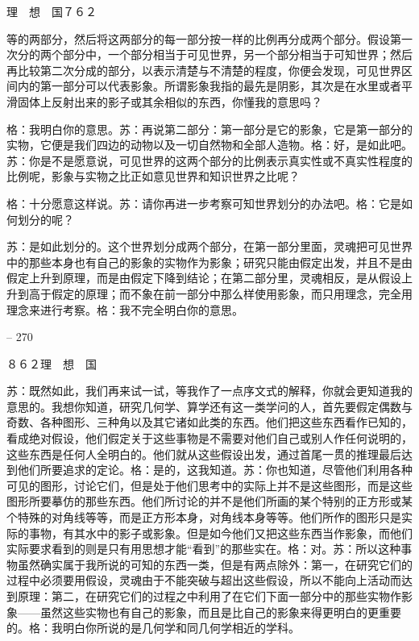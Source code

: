 \documentclass[11pt,oneside]{book}
\begin{document}
\begin{common-format}
    理　想　国７６２

    等的两部分，然后将这两部分的每一部分按一样的比例再分成两个部分。假设第一次分的两个部分中，一个部分相当于可见世界，另一个部分相当于可知世界；然后再比较第二次分成的部分，以表示清楚与不清楚的程度，你便会发现，可见世界区间内的第一部分可以代表影象。所谓影象我指的最先是阴影，其次是在水里或者平滑固体上反射出来的影子或其余相似的东西，你懂我的意思吗？

    格：我明白你的意思。苏：再说第二部分：第一部分是它的影象，它是第一部分的实物，它便是我们四边的动物以及一切自然物和全部人造物。格：好，是如此吧。苏：你是不是愿意说，可见世界的这两个部分的比例表示真实性或不真实性程度的比例呢，影象与实物之比正如意见世界和知识世界之比呢？

    格：十分愿意这样说。苏：请你再进一步考察可知世界划分的办法吧。格：它是如何划分的呢？

    苏：是如此划分的。这个世界划分成两个部分，在第一部分里面，灵魂把可见世界中的那些本身也有自己的影象的实物作为影象；研究只能由假定出发，并且不是由假定上升到原理，而是由假定下降到结论；在第二部分里，灵魂相反，是从假设上升到高于假定的原理；而不象在前一部分中那么样使用影象，而只用理念，完全用理念来进行考察。格：我不完全明白你的意思。

    

-- 270

    ８６２理　想　国

    苏：既然如此，我们再来试一试，等我作了一点序文式的解释，你就会更知道我的意思的。我想你知道，研究几何学、算学还有这一类学问的人，首先要假定偶数与奇数、各种图形、三种角以及其它诸如此类的东西。他们把这些东西看作已知的，看成绝对假设，他们假定关于这些事物是不需要对他们自己或别人作任何说明的，这些东西是任何人全明白的。他们就从这些假设出发，通过首尾一贯的推理最后达到他们所要追求的定论。格：是的，这我知道。苏：你也知道，尽管他们利用各种可见的图形，讨论它们，但是处于他们思考中的实际上并不是这些图形，而是这些图形所要摹仿的那些东西。他们所讨论的并不是他们所画的某个特别的正方形或某个特殊的对角线等等，而是正方形本身，对角线本身等等。他们所作的图形只是实际的事物，有其水中的影子或影象。但是如今他们又把这些东西当作影象，而他们实际要求看到的则是只有用思想才能“看到”的那些实在。格：对。苏：所以这种事物虽然确实属于我所说的可知的东西一类，但是有两点除外：第一，在研究它们的过程中必须要用假设，灵魂由于不能突破与超出这些假设，所以不能向上活动而达到原理：第二，在研究它们的过程之中利用了在它们下面一部分中的那些实物作影象——虽然这些实物也有自己的影象，而且是比自己的影象来得更明白的更重要的。格：我明白你所说的是几何学和同几何学相近的学科。


\end{common-format}
\end{document}
